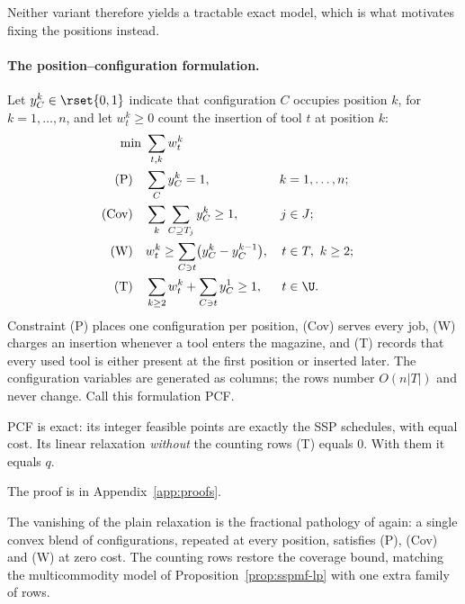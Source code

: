Neither variant therefore yields a tractable exact model, which is what motivates
fixing the positions instead.

\paragraph{The position--configuration formulation.}
Let $y_C^{k}\in\rset{0,1}$ indicate that configuration $C$ occupies position $k$, for
$k=1,\dots,n$, and let $w_t^{k}\ge0$ count the insertion of tool $t$ at position $k$:
\[
\begin{aligned}
  \min\ & \sum_{t,k} w_t^{k}\\
  \text{(P)}\quad & \sum_{C} y_C^{k}=1, & k&=1,\dots,n;\\
  \text{(Cov)}\quad & \sum_{k}\sum_{C\supseteq T_j} y_C^{k}\ge1, & j&\in J;\\
  \text{(W)}\quad & w_t^{k}\ge\sum_{C\ni t}\bigl(y_C^{k}-y_C^{k-1}\bigr), & t&\in T,\ k\ge2;\\
  \text{(T)}\quad & \sum_{k\ge2} w_t^{k}+\sum_{C\ni t} y_C^{1}\ge1, & t&\in\U.
\end{aligned}
\]
Constraint (P) places one configuration per position, (Cov) serves every job, (W)
charges an insertion whenever a tool enters the magazine, and (T) records that every
used tool is either present at the first position or inserted later. The
configuration variables are generated as columns; the rows number
$O(n\lvert T\rvert)$ and never change. Call this formulation PCF.

\begin{proposition}\label{prop:pcf}
PCF is exact: its integer feasible points are exactly the SSP schedules, with equal
cost. Its linear relaxation \emph{without} the counting rows (T) equals $0$. With
them it equals $q$.
\end{proposition}

The proof is in Appendix~\ref{app:proofs}.

The vanishing of the plain relaxation is the fractional pathology of
\citet{Tang1988} again: a single convex blend of configurations, repeated at every
position, satisfies (P), (Cov) and (W) at zero cost. The counting rows restore the
coverage bound, matching the multicommodity model of
Proposition~\ref{prop:sspmf-lp} with one extra family of rows.

